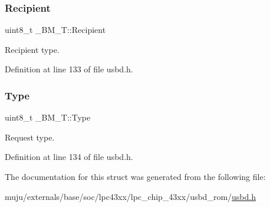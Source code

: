\subsubsection{\texorpdfstring{Recipient}{Recipient}}
{\footnotesize\ttfamily uint8\+\_\+t \+\_\+\+B\+M\+\_\+\+T\+::\+Recipient}

Recipient type. 

Definition at line 133 of file usbd.\+h.

\mbox{\label{struct___b_m___t_a5fd0780bac15d2e87e04493d68941415}} 
\subsubsection{\texorpdfstring{Type}{Type}}
{\footnotesize\ttfamily uint8\+\_\+t \+\_\+\+B\+M\+\_\+\+T\+::\+Type}

Request type. 

Definition at line 134 of file usbd.\+h.



The documentation for this struct was generated from the following file\+:\begin{DoxyCompactItemize}
\item 
muju/externals/base/soc/lpc43xx/lpc\+\_\+chip\+\_\+43xx/usbd\+\_\+rom/\hyperlink{usbd_8h}{usbd.\+h}\end{DoxyCompactItemize}

